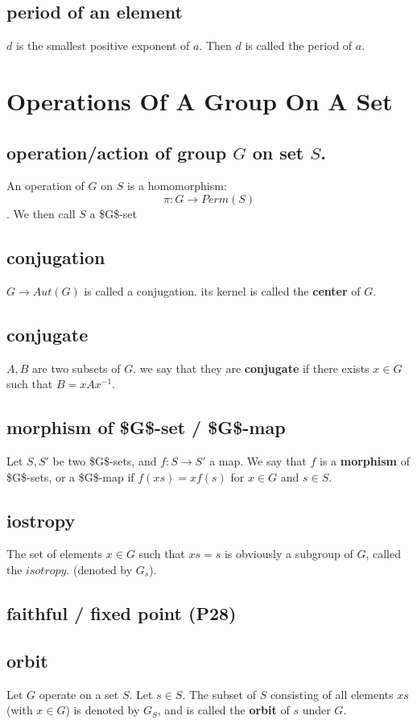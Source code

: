 \documentclass[11pt]{article}
\begin{document}
\subsection{period of an element}
\label{sec:org12a29e0}
\(d\) is the smallest positive exponent of \(a\).
Then \(d\) is called the period of \(a\).
\section{Operations Of A Group On A Set}
\label{sec:orgdc3f612}
\subsection{operation/action of group \(G\) on set \(S\).}
\label{sec:org412bd80}
An operation of \(G\) on \(S\) is a homomorphism:
\[\pi: G\to Perm(S) \]. 
We then call \(S\) a \$G\$-set
\subsection{conjugation}
\label{sec:org3338240}
\(G\to Aut(G)\) is called a conjugation.
its kernel is called the \textbf{center} of \(G\).
\subsection{conjugate}
\label{sec:orgde221a4}
\(A, B\) are two subsets of \(G\). we say that they are
\textbf{conjugate} if there exists \(x\in G\) such that \(B = xAx^{-1}\).
\subsection{morphism of \$G\$-set / \$G\$-map}
\label{sec:orgf496e80}
Let \(S, S'\) be two \$G\$-sets, and \(f:S\to S'\) a map.
We say that \(f\) is a \textbf{morphism} of \$G\$-sets, or a \$G\$-map
if \(f(xs) = xf(s)\) for \(x\in G\) and \(s\in S\).
\subsection{iostropy}
\label{sec:orgc58e481}
The set of elements \(x\in G\) such that \(xs = s\) is obviously
a subgroup of \(G\), called the \(isotropy\).
(denoted by \(G_s\)).
\subsection{faithful / fixed point (P28)}
\label{sec:orga714738}
\subsection{orbit}
\label{sec:org4abdb87}
Let \(G\) operate on a set \(S\). Let \(s\in S\). The subset
of \(S\) consisting of all elements \(xs\) (with \(x\in G\)) is
denoted by \(G_S\), and is called the \textbf{orbit} of \(s\) under \(G\).
\end{document}
